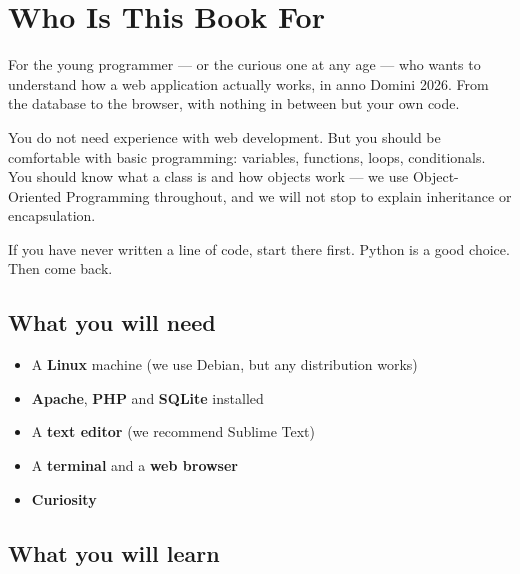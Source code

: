 \documentclass[11pt,a4paper,oneside]{book}
\providecommand{\tightlist}{%
  \setlength{\itemsep}{0pt}\setlength{\parskip}{0pt}}
\begin{document}
\setcounter{chapter}{-1}

\hypertarget{who-is-this-book-for}{%
\chapter*{Who Is This Book For}\label{who-is-this-book-for}}

For the young programmer --- or the curious one at any age ---
who wants to understand how a web application actually works, in
anno Domini 2026. From the database to the browser, with nothing
in between but your own code.

You do not need experience with web development. But you should
be comfortable with basic programming: variables, functions,
loops, conditionals. You should know what a class is and how
objects work --- we use Object-Oriented Programming throughout,
and we will not stop to explain inheritance or encapsulation.

If you have never written a line of code, start there first.
Python is a good choice. Then come back.

\hypertarget{what-you-will-need}{%
\section*{What you will need}\label{what-you-will-need}}

\begin{itemize}
\tightlist
\item
  A \textbf{Linux} machine (we use Debian, but any distribution
  works)
\item
  \textbf{Apache}, \textbf{PHP} and \textbf{SQLite} installed
\item
  A \textbf{text editor} (we recommend Sublime Text)
\item
  A \textbf{terminal} and a \textbf{web browser}
\item
  \textbf{Curiosity}
\end{itemize}

\hypertarget{what-you-will-learn}{%
\section*{What you will learn}\label{what-you-will-learn}}
\end{document}
